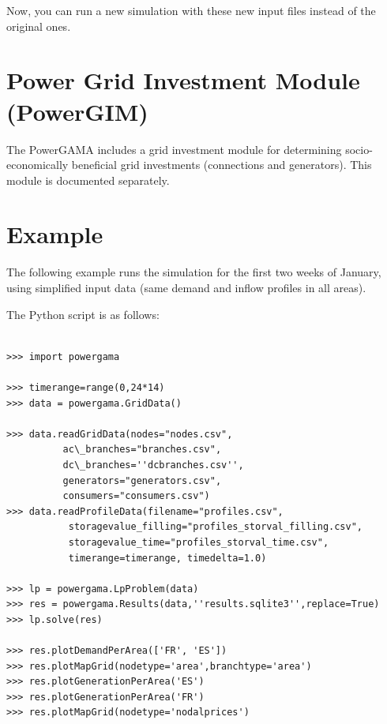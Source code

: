 \documentclass{article}
\begin{document}
Now, you can run a new simulation with these new input files instead of the original ones.

\section{Power Grid Investment Module (PowerGIM)}
The PowerGAMA includes a grid investment module for determining socio-economically beneficial grid investments (connections and generators). This module is documented separately.


\section{Example}

The following example runs the simulation for the first two weeks of January, using simplified input data (same demand and inflow profiles in all areas).

The Python script is as follows: 

\begin{lstlisting}

>>> import powergama

>>> timerange=range(0,24*14)
>>> data = powergama.GridData()

>>> data.readGridData(nodes="nodes.csv",
          ac\_branches="branches.csv",
          dc\_branches=''dcbranches.csv'',
          generators="generators.csv",
          consumers="consumers.csv")
>>> data.readProfileData(filename="profiles.csv",
           storagevalue_filling="profiles_storval_filling.csv",
           storagevalue_time="profiles_storval_time.csv",
           timerange=timerange, timedelta=1.0)

>>> lp = powergama.LpProblem(data)
>>> res = powergama.Results(data,''results.sqlite3'',replace=True)
>>> lp.solve(res)

>>> res.plotDemandPerArea(['FR', 'ES'])
>>> res.plotMapGrid(nodetype='area',branchtype='area')
>>> res.plotGenerationPerArea('ES')
>>> res.plotGenerationPerArea('FR')
>>> res.plotMapGrid(nodetype='nodalprices')

\end{lstlisting}
\end{document}
